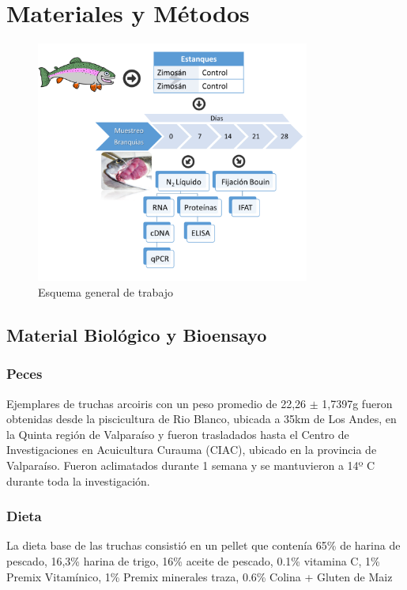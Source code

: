 \documentclass[12pt,letterpaper,oneside]{scrbook}
\begin{document}
\clearpage

\chapter{Materiales y Métodos}

\begin{figure}[h!]
    \centering
    \includegraphics[width=9cm]{esquema} 
    \caption {Esquema general de trabajo}
    \label {fig:esquema}
\end{figure}

\section{Material Biológico y Bioensayo}\subsection{Peces}

Ejemplares de truchas arcoiris con un peso promedio de 22,26 \(\pm\)
1,7397g fueron obtenidas desde la piscicultura de Rio Blanco, ubicada a
35km de Los Andes, en la Quinta región de Valparaíso y fueron
trasladados hasta el Centro de Investigaciones en Acuicultura Curauma
(CIAC), ubicado en la provincia de Valparaíso. Fueron aclimatados
durante 1 semana y se mantuvieron a 14º C durante toda la investigación.

\subsection{Dieta}

La dieta base de las truchas consistió en un pellet que contenía 65\% de
harina de pescado, 16,3\% harina de trigo, 16\% aceite de pescado, 0.1\%
vitamina C, 1\% Premix Vitamínico, 1\% Premix minerales traza, 0.6\%
Colina + Gluten de Maiz
\end{document}
